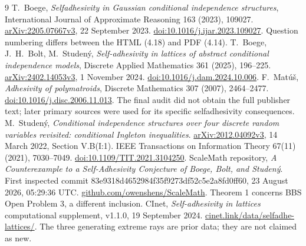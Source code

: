 \documentclass[11pt]{article}
\begin{document}
\begin{thebibliography}{9}
 T.~Boege, \emph{Selfadhesivity in Gaussian conditional independence
structures}, International Journal of Approximate Reasoning 163 (2023), 109027.
\href{https://arxiv.org/abs/2205.07667v3}{arXiv:2205.07667v3}, 22 September 2023.
\href{https://doi.org/10.1016/j.ijar.2023.109027}{doi:10.1016/j.ijar.2023.109027}.
Question numbering differs between the HTML (4.18) and PDF (4.14).
 T.~Boege, J.~H.~Bolt, M.~Studen\'y, \emph{Self-adhesivity in lattices
of abstract conditional independence models}, Discrete Applied Mathematics
361 (2025), 196--225. \href{https://arxiv.org/abs/2402.14053v3}{arXiv:2402.14053v3},
1 November 2024. \href{https://doi.org/10.1016/j.dam.2024.10.006}{doi:10.1016/j.dam.2024.10.006}.
 F.~Mat\'u\v{s}, \emph{Adhesivity of polymatroids}, Discrete
Mathematics 307 (2007), 2464--2477.
\href{https://doi.org/10.1016/j.disc.2006.11.013}{doi:10.1016/j.disc.2006.11.013}.
The final audit did not obtain the full publisher text; later primary sources
were used for its specific selfadhesivity consequences.
 M.~Studen\'y, \emph{Conditional independence structures over
four discrete random variables revisited: conditional Ingleton inequalities}.
\href{https://arxiv.org/abs/2012.04092v3}{arXiv:2012.04092v3}, 14 March 2022, Section V.B(I:1).
IEEE Transactions on Information Theory 67(11) (2021), 7030--7049.
\href{https://doi.org/10.1109/TIT.2021.3104250}{doi:10.1109/TIT.2021.3104250}.
 ScaleMath repository, \emph{A Counterexample to a
Self-Adhesivity Conjecture of Boege, Bolt, and Studen\'y}.
First inspected commit 83e9318d4652984f35f9273df52c5e2a8fd0ff60,
23 August 2026, 05:29:36 UTC.
\href{https://github.com/owenshens/ScaleMath}{github.com/owenshens/ScaleMath}.
Theorem 1 concerns BBS Open Problem 3, a different inclusion.
 CInet, \emph{Self-adhesivity in lattices} computational supplement,
v1.1.0, 19 September 2024.
\href{https://cinet.link/data/selfadhe-lattices/}{cinet.link/data/selfadhe-lattices/}.
The three generating extreme rays are prior data; they are not claimed as new.
\end{thebibliography}
\end{document}
